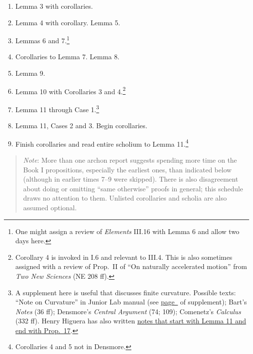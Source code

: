 \documentclass[10pt]{article}
\begin{document}
\begin{enumerate}[resume*] \item Lemma 3 with
		corollaries.  \item Lemma 4 with corollary.
		Lemma 5.  \item Lemmas 6 and 7.\footnote{One
			might assign a review of
			\emph{Elements} III.16 with Lemma 6
			and allow two days here.} \item
		Corollaries to Lemma 7. Lemma 8.  \item
		Lemma 9.  \item Lemma 10 with Corollaries 3
		and 4.\footnote{Corollary 4 is invoked in
			I.6 and relevant to III.4. This is
			also sometimes assigned with a
			review of Prop.~II of ``On naturally
			accelerated motion'' from \emph{Two
				New Sciences} (NE 208 ff).}
	\item Lemma 11 through Case 1.\footnote{A supplement
			here is useful that discusses finite
			curvature. Possible texts: ``Note on
			Curvature'' in Junior Lab manual
			(see
			\hyperref[supple.74]{page~\pageref{supple.74}}
			of supplement); Bart's \emph{Notes}
			(36 ff); Densmore's \emph{Central
				Argument} (74; 109);
			Comenetz's \emph{Calculus} (332 ff).
			Henry Higuera has also written
			\href{https://drive.google.com/file/d/1YZfQPV6poJMzZvZ3DyGfJopGkzy7oe7K/view?usp=sharing}{notes
			that start with Lemma 11 and
			end with Prop.~17}.}
	\item Lemma 11,
		Cases 2 and 3.  Begin corollaries.  \item
		Finish corollaries and read entire scholium
		to Lemma 11.\footnote{Corollaries 4 and 5 not in Densmore.}  \end{enumerate}
		\begin{quote}
		\vspace{-0.5em}
	{\small \emph{Note}: More than one archon report
		suggests spending more time on the Book I
		propositions, especially the earliest ones,
		than indicated below (although in earlier
		times 7--9 were skipped).  There is also
		disagreement about doing or omitting ``same
		otherwise'' proofs in general; this schedule
		draws no attention to them. Unlisted
		corollaries and scholia are also assumed
		optional.
		
		} \end{quote}
\end{document}
